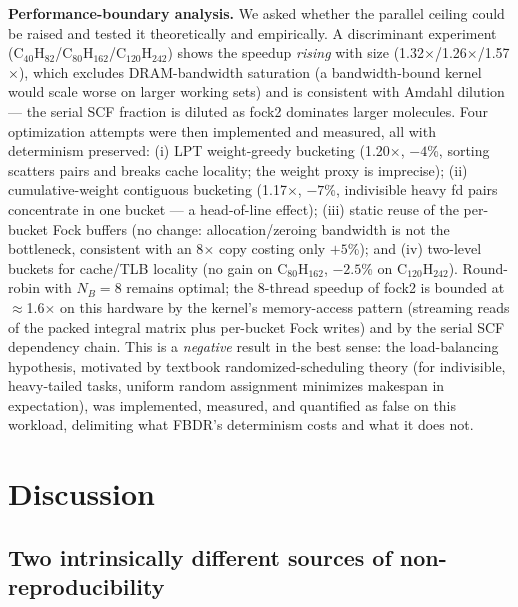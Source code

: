 \documentclass[preprint,12pt]{elsarticle}
\begin{document}
\textbf{Performance-boundary analysis.} We asked whether the parallel ceiling could be raised and tested it theoretically and empirically. A discriminant experiment (C$_{40}$H$_{82}$/C$_{80}$H$_{162}$/C$_{120}$H$_{242}$) shows the speedup \emph{rising} with size (1.32$\times$/1.26$\times$/1.57$\times$), which excludes DRAM-bandwidth saturation (a bandwidth-bound kernel would scale worse on larger working sets) and is consistent with Amdahl dilution --- the serial SCF fraction is diluted as fock2 dominates larger molecules. Four optimization attempts were then implemented and measured, all with determinism preserved: (i) LPT weight-greedy bucketing (1.20$\times$, $-4$\%, sorting scatters pairs and breaks cache locality; the weight proxy is imprecise); (ii) cumulative-weight contiguous bucketing (1.17$\times$, $-7$\%, indivisible heavy fd pairs concentrate in one bucket --- a head-of-line effect); (iii) static reuse of the per-bucket Fock buffers (no change: allocation/zeroing bandwidth is not the bottleneck, consistent with an 8$\times$ copy costing only $+5$\%); and (iv) two-level buckets for cache/TLB locality (no gain on C$_{80}$H$_{162}$, $-2.5$\% on C$_{120}$H$_{242}$). Round-robin with $N_B = 8$ remains optimal; the 8-thread speedup of fock2 is bounded at $\approx$1.6$\times$ on this hardware by the kernel's memory-access pattern (streaming reads of the packed integral matrix plus per-bucket Fock writes) and by the serial SCF dependency chain. This is a \emph{negative} result in the best sense: the load-balancing hypothesis, motivated by textbook randomized-scheduling theory (for indivisible, heavy-tailed tasks, uniform random assignment minimizes makespan in expectation), was implemented, measured, and quantified as false on this workload, delimiting what FBDR's determinism costs and what it does not.

\section{Discussion}\label{sec:disc}

\subsection{Two intrinsically different sources of non-reproducibility}\label{sec:disc-two}
\end{document}
